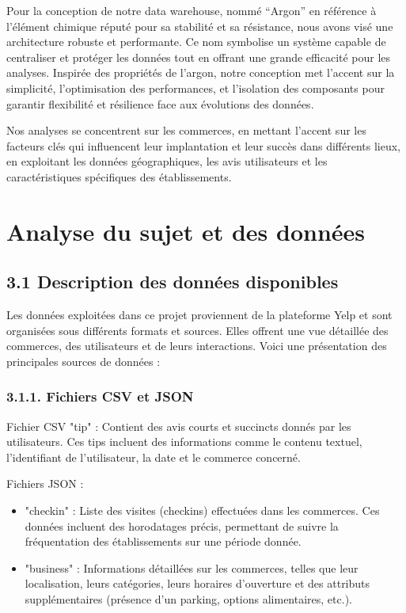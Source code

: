 Pour la conception de notre data warehouse, nommé “Argon” en référence à l’élément chimique réputé pour sa stabilité et sa résistance, nous avons visé une architecture robuste et performante. Ce nom symbolise un système capable de centraliser et protéger les données tout en offrant une grande efficacité pour les analyses. Inspirée des propriétés de l’argon, notre conception met l’accent sur la simplicité, l’optimisation des performances, et l’isolation des composants pour garantir flexibilité et résilience face aux évolutions des données. 


Nos analyses se concentrent sur les commerces, en mettant l'accent sur les facteurs clés qui influencent leur implantation et leur succès dans différents lieux, en exploitant les données géographiques, les avis utilisateurs et les caractéristiques spécifiques des établissements.


\chapter*{Analyse du sujet et des données}


\section*{3.1 Description des données disponibles}
Les données exploitées dans ce projet proviennent de la plateforme Yelp et sont organisées sous différents formats et sources. Elles offrent une vue détaillée des commerces, des utilisateurs et de leurs interactions. Voici une présentation des principales sources de données :


\subsection*{3.1.1. Fichiers CSV et JSON}

Fichier CSV "tip" : Contient des avis courts et succincts donnés par les utilisateurs. Ces tips incluent des informations comme le contenu textuel, l’identifiant de l’utilisateur, la date et le commerce concerné.


Fichiers JSON :

\begin{itemize}
\item "checkin" : Liste des visites (checkins) effectuées dans les commerces. Ces données incluent des horodatages précis, permettant de suivre la fréquentation des établissements sur une période donnée.


\item "business" : Informations détaillées sur les commerces, telles que leur localisation, leurs catégories, leurs horaires d'ouverture et des attributs supplémentaires (présence d’un parking, options alimentaires, etc.).


\end{itemize}

